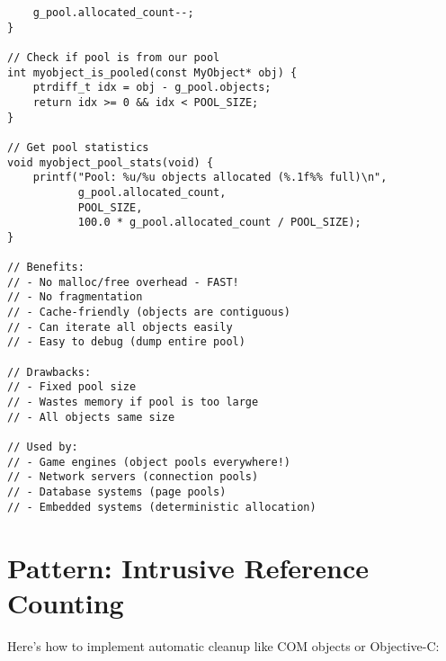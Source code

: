 \begin{lstlisting}
    g_pool.allocated_count--;
}

// Check if pool is from our pool
int myobject_is_pooled(const MyObject* obj) {
    ptrdiff_t idx = obj - g_pool.objects;
    return idx >= 0 && idx < POOL_SIZE;
}

// Get pool statistics
void myobject_pool_stats(void) {
    printf("Pool: %u/%u objects allocated (%.1f%% full)\n",
           g_pool.allocated_count,
           POOL_SIZE,
           100.0 * g_pool.allocated_count / POOL_SIZE);
}

// Benefits:
// - No malloc/free overhead - FAST!
// - No fragmentation
// - Cache-friendly (objects are contiguous)
// - Can iterate all objects easily
// - Easy to debug (dump entire pool)

// Drawbacks:
// - Fixed pool size
// - Wastes memory if pool is too large
// - All objects same size

// Used by:
// - Game engines (object pools everywhere!)
// - Network servers (connection pools)
// - Database systems (page pools)
// - Embedded systems (deterministic allocation)
\end{lstlisting}

\section{Pattern: Intrusive Reference Counting}

Here's how to implement automatic cleanup like COM objects or Objective-C:


